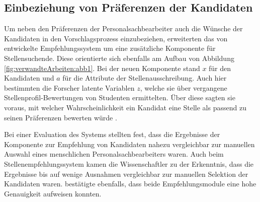 \subsection{Einbeziehung von Präferenzen der Kandidaten}
\label{ch:verwandteArbeiten:aufDemPEFitBasierendeBilateraleSysteme:einbeziehungKandidaten}
Um neben den Präferenzen der Personalsachbearbeiter auch die Wünsche der Kandidaten in den Vorschlagsprozess einzubeziehen, erweiterten \textcite[S. 4f.]{malinowski:2006} das von \textcite[S. 4ff.]{faerber:2003} entwickelte Empfehlungssystem um eine zusätzliche Komponente für Stellensuchende. Diese orientierte sich ebenfalls am Aufbau von Abbildung \ref{fig:verwandteArbeiten:abb1}. Bei der neuen Komponente stand $x$ für den Kandidaten und $a$ für die Attribute der Stellenausschreibung. Auch hier bestimmten die Forscher latente Variablen $z$, welche sie über vergangene Stellenprofil-Bewertungen von Studenten ermittelten. Über diese sagten sie voraus, mit welcher Wahrscheinlichkeit ein Kandidat eine Stelle als passend zu seinen Präferenzen bewerten würde \cite[S. 4f.]{malinowski:2006}.

Bei einer Evaluation des Systems stellten \textcite[S. 6f.]{malinowski:2006} fest, dass die Ergebnisse der Komponente zur Empfehlung von Kandidaten nahezu vergleichbar zur manuellen Auswahl eines menschlichen Personalsachbearbeiters waren. Auch beim Stellenempfehlungssystem kamen die Wissenschaftler zu der Erkenntnis, dass die Ergebnisse bis auf wenige Ausnahmen vergleichbar zur manuellen Selektion der Kandidaten waren. \textcite[S. 7]{keim:2007} bestätigte ebenfalls, dass beide Empfehlungsmodule eine hohe Genauigkeit aufweisen konnten.

